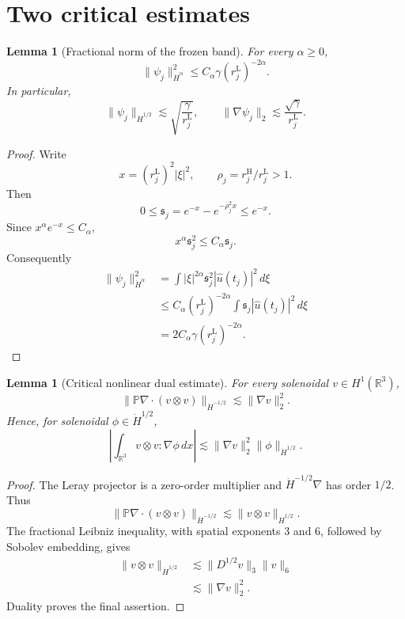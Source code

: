 \documentclass[11pt]{article}
\newtheorem{lemma}[theorem]{Lemma}
\theoremstyle{remark}
\newcommand{\R}{\mathbb R}
\begin{document}
\section{Two critical estimates}

\begin{lemma}[Fractional norm of the frozen band]
For every \(\alpha\ge0\),
\[
 \|\psi_j\|_{\dot H^\alpha}^2
 \le
 C_\alpha\gamma(r_j^{\mathrm L})^{-2\alpha}.
\]
In particular,
\[
 \|\psi_j\|_{\dot H^{1/2}}
 \lesssim
 \sqrt{\frac{\gamma}{r_j^{\mathrm L}}},
 \qquad
 \|\nabla\psi_j\|_2
 \lesssim
 \frac{\sqrt\gamma}{r_j^{\mathrm L}}.
\]
\end{lemma}

\begin{proof}
Write
\[
 x=(r_j^{\mathrm L})^2|\xi|^2,
 \qquad
 \rho_j=r_j^{\mathrm H}/r_j^{\mathrm L}>1.
\]
Then
\[
 0\le\mathfrak s_j=e^{-x}-e^{-\rho_j^2x}\le e^{-x}.
\]
Since \(x^\alpha e^{-x}\le C_\alpha\),
\[
 x^\alpha\mathfrak s_j^2
 \le C_\alpha\mathfrak s_j.
\]
Consequently
\[
\begin{aligned}
 \|\psi_j\|_{\dot H^\alpha}^2
 &=
 \int |\xi|^{2\alpha}
 \mathfrak s_j^2|\widehat u(t_j)|^2\,d\xi\\
 &\le
 C_\alpha(r_j^{\mathrm L})^{-2\alpha}
 \int\mathfrak s_j|\widehat u(t_j)|^2\,d\xi\\
 &=
 2C_\alpha\gamma(r_j^{\mathrm L})^{-2\alpha}.
\end{aligned}
\]
\end{proof}

\begin{lemma}[Critical nonlinear dual estimate]
For every solenoidal \(v\in H^1(\R^3)\),
\[
 \|\mathbb P\nabla\!\cdot(v\otimes v)\|_{\dot H^{-1/2}}
 \lesssim
 \|\nabla v\|_2^2.
\]
Hence, for solenoidal \(\phi\in\dot H^{1/2}\),
\[
 \left|\int_{\R^3}v\otimes v:\nabla\phi\,dx\right|
 \lesssim
 \|\nabla v\|_2^2\|\phi\|_{\dot H^{1/2}}.
\]
\end{lemma}

\begin{proof}
The Leray projector is a zero-order multiplier and
\(\dot H^{-1/2}\nabla\) has order \(1/2\).  Thus
\[
 \|\mathbb P\nabla\!\cdot(v\otimes v)\|_{\dot H^{-1/2}}
 \lesssim
 \|v\otimes v\|_{\dot H^{1/2}}.
\]
The fractional Leibniz inequality, with spatial exponents \(3\) and \(6\),
followed by Sobolev embedding, gives
\[
\begin{aligned}
 \|v\otimes v\|_{\dot H^{1/2}}
 &\lesssim
 \|D^{1/2}v\|_3\|v\|_6\\
 &\lesssim
 \|\nabla v\|_2^2.
\end{aligned}
\]
Duality proves the final assertion.
\end{proof}
\end{document}
